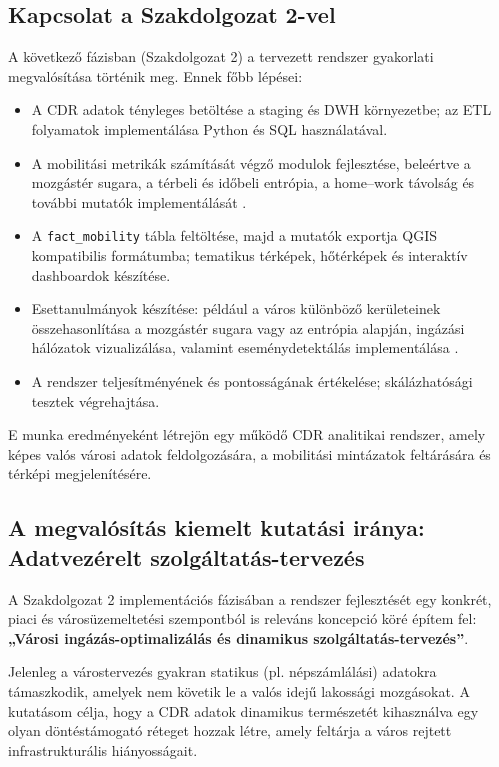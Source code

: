 \subsection{Kapcsolat a Szakdolgozat 2-vel}
A következő fázisban (Szakdolgozat 2) a tervezett rendszer gyakorlati megvalósítása
történik meg. Ennek főbb lépései:
\begin{itemize}
	\item A CDR adatok tényleges betöltése a staging és DWH környezetbe; az ETL
		folyamatok implementálása Python és SQL használatával.

	\item A mobilitási metrikák számítását végző modulok fejlesztése, beleértve a
		mozgástér sugara, a térbeli és időbeli entrópia, a home–work távolság és
		további mutatók implementálását
		\cite{pinter2021evaluating, pinter2022awakening}.

	\item A \texttt{fact\_mobility} tábla feltöltése, majd a mutatók exportja QGIS
		kompatibilis formátumba; tematikus térképek, hőtérképek és interaktív dashboardok
		készítése.

	\item Esettanulmányok készítése: például a város különböző kerületeinek
		összehasonlítása a mozgástér sugara vagy az entrópia alapján, ingázási hálózatok
		vizualizálása, valamint eseménydetektálás implementálása
		\cite{pinter2021evaluating, traag2011social}.

	\item A rendszer teljesítményének és pontosságának értékelése; skálázhatósági
		tesztek végrehajtása.
\end{itemize}
E munka eredményeként létrejön egy működő CDR analitikai rendszer, amely képes
valós városi adatok feldolgozására, a mobilitási mintázatok feltárására és térképi
megjelenítésére.


\subsection{A megvalósítás kiemelt kutatási iránya: Adatvezérelt szolgáltatás-tervezés}

A Szakdolgozat 2 implementációs fázisában a rendszer fejlesztését egy konkrét, piaci és városüzemeltetési szempontból is releváns koncepció köré építem fel: \textbf{„Városi ingázás-optimalizálás és dinamikus szolgáltatás-tervezés”}.

Jelenleg a várostervezés gyakran statikus (pl. népszámlálási) adatokra támaszkodik, amelyek nem követik le a valós idejű lakossági mozgásokat. A kutatásom célja, hogy a CDR adatok dinamikus természetét kihasználva egy olyan döntéstámogató réteget hozzak létre, amely feltárja a város rejtett infrastrukturális hiányosságait.

